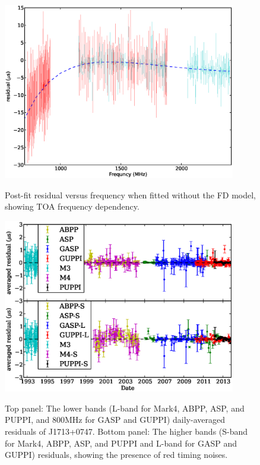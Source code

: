 \documentclass[12pt,preprint]{aastex}
\begin{document}
\begin{figure}
\includegraphics[width=4in]{FD.ps} \\ 
\caption {\label{fig:FD} Post-fit residual versus frequency when fitted
without the FD model, showing TOA frequency dependency.} 
\end{figure} 

\begin{figure}
\includegraphics[width=4in]{residual.eps} \\ 
\caption {\label{fig:res} Top panel: The lower bands (L-band for
Mark4, ABPP, ASP, and PUPPI, and 800MHz for GASP and GUPPI) daily-averaged residuals of
J1713+0747. Bottom panel: The higher bands (S-band for Mark4, ABPP, ASP, and PUPPI and
L-band for GASP and GUPPI) residuals, showing the presence of red timing noises.} 
\end{figure} 
\end{document}
